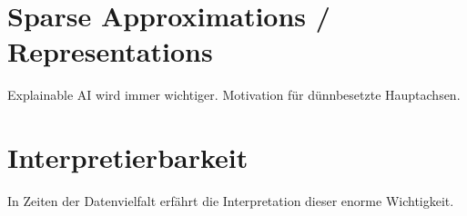 \section{Sparse Approximations / Representations}

Explainable AI wird immer wichtiger. Motivation für dünnbesetzte Hauptachsen.

\section{Interpretierbarkeit}

In Zeiten der Datenvielfalt erfährt die Interpretation dieser enorme Wichtigkeit.